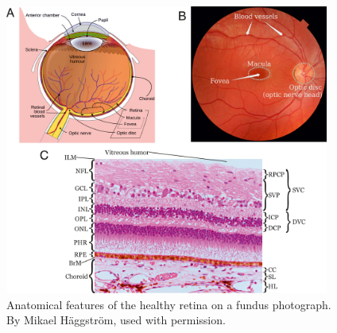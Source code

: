 \documentclass[12pt,a4paper]{journal}
\begin{document}
\begin{figure}[ht]
  \centering
  \includegraphics[width=0.95\textwidth]{Figure1}
  \caption{Anatomical features of the healthy retina on a fundus photograph. By Mikael H\"aggstr\"om, used with permission.}
  \label{fig:Scans}
\end{figure}

\end{document}
